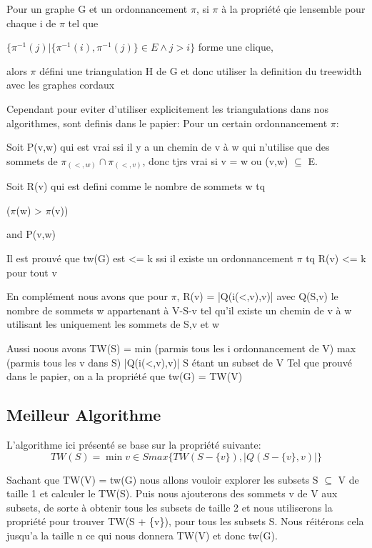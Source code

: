 \documentclass[a4paper, 12pt]{article}
\begin{document}
Pour un graphe G et un ordonnancement $\pi$, si $\pi$ à la propriété qie lensemble pour chaque i de $\pi$ tel que

$\{\pi^{-1}(j) | \{\pi^{-1}(i),\pi^{-1}(j)\} \in E \wedge j > i\}$ forme une clique,

alors $\pi$ défini une triangulation H de G et donc utiliser la definition du
treewidth avec les graphes cordaux

Cependant pour eviter d'utiliser explicitement les triangulations dans nos 
algorithmes, 
sont definis dans le papier:
Pour un certain ordonnancement $\pi$: 

Soit P(v,w) qui est vrai ssi il y a un chemin de v à w qui n'utilise que 
des sommets de $\pi_{(<,w)} \cap \pi_{(<,v)}$, donc tjrs vrai si v = w ou 
(v,w) $\subseteq$ E.

Soit R(v) qui est defini comme le nombre de sommets w tq {($\pi$(w) > $\pi$(v)) 

and P(v,w)}

Il est prouvé que tw(G) est <= k ssi il existe un 
ordonnancement $\pi$ tq R(v) <= k pour tout v 

En complément nous avons que pour $\pi$, R(v) = |Q(i(<,v),v)| avec Q(S,v) le 
nombre de sommets w appartenant à V-S-{v} tel qu'il existe un chemin de
v à w utilisant les uniquement les sommets de S,v et w 

Aussi noous avons
TW(S) = min (parmis tous les i ordonnancement de V) max 
(parmis tous les v dans S) |Q(i(<,v),v)| S étant un subset de V
Tel que prouvé dans le papier, on a la propriété que tw(G) = TW(V)

\subsection{Meilleur Algorithme}

L'algorithme ici présenté se base sur la propriété suivante:
\begin{equation}
  TW(S) = \min{v \in S} max \{ TW(S-\{ v \}), |Q(S-\{v\},v)| \}
\end{equation}

Sachant que TW(V) = tw(G) nous allons vouloir explorer les subsets
S $\subseteq$ V de taille 1 et calculer le TW(S). Puis nous ajouterons des
sommets v de V aux subsets, de sorte à obtenir tous les subsets de taille 2 et nous utiliserons la propriété pour trouver TW(S + \{v\}), pour tous les subsets S. Nous réitérons cela jusqu'a la taille n ce qui nous donnera TW(V) et donc tw(G).
\end{document}

